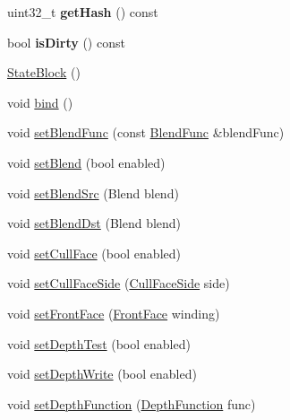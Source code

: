 \begin{DoxyCompactItemize}
\item 
\mbox{\label{classRenderState_1_1StateBlock_ad1160751d0b0039ade6f575392c8a735}} 
uint32\+\_\+t {\bfseries get\+Hash} () const
\item 
\mbox{\label{classRenderState_1_1StateBlock_aac80240fe4044f00004ddaddaa14b68d}} 
bool {\bfseries is\+Dirty} () const
\item 
\hyperlink{classRenderState_1_1StateBlock_ad40095d868f989d391b039c4a470b87d}{State\+Block} ()
\item 
void \hyperlink{classRenderState_1_1StateBlock_a045055d7b3f19710d52f2a00900fec50}{bind} ()
\item 
void \hyperlink{classRenderState_1_1StateBlock_a68e05f7ba5e689c06d584bf714cecb61}{set\+Blend\+Func} (const \hyperlink{structBlendFunc}{Blend\+Func} \&blend\+Func)
\item 
void \hyperlink{classRenderState_1_1StateBlock_a39bd0858d8bb963f844805f32693b681}{set\+Blend} (bool enabled)
\item 
void \hyperlink{classRenderState_1_1StateBlock_a1863a0ca059594f9c14e7311123951fe}{set\+Blend\+Src} (Blend blend)
\item 
void \hyperlink{classRenderState_1_1StateBlock_a20465bd4399b6559ae274f9556abec97}{set\+Blend\+Dst} (Blend blend)
\item 
void \hyperlink{classRenderState_1_1StateBlock_aee954a3ca23df9c4fbe91aed0d62c216}{set\+Cull\+Face} (bool enabled)
\item 
void \hyperlink{classRenderState_1_1StateBlock_af8d4f7b418f321ed9a275ded0cbe5ec4}{set\+Cull\+Face\+Side} (\hyperlink{classRenderState_a9b99d2625b13af77f1f8fa8101e3ad85}{Cull\+Face\+Side} side)
\item 
void \hyperlink{classRenderState_1_1StateBlock_aeb2cec31e5c14cfc37205b5a2d798ec8}{set\+Front\+Face} (\hyperlink{classRenderState_ac748310042b020a92ea97ede898be30e}{Front\+Face} winding)
\item 
void \hyperlink{classRenderState_1_1StateBlock_a3429ac03013bdc1826b578f772d88992}{set\+Depth\+Test} (bool enabled)
\item 
void \hyperlink{classRenderState_1_1StateBlock_a49ef11a9c1f4d967e184fbfa3c39f4bc}{set\+Depth\+Write} (bool enabled)
\item 
void \hyperlink{classRenderState_1_1StateBlock_ae38edb63f630b68248db0d33c649c34f}{set\+Depth\+Function} (\hyperlink{classRenderState_a36d3d228500feb75244c2c761c42b231}{Depth\+Function} func)

\end{DoxyCompactItemize}
